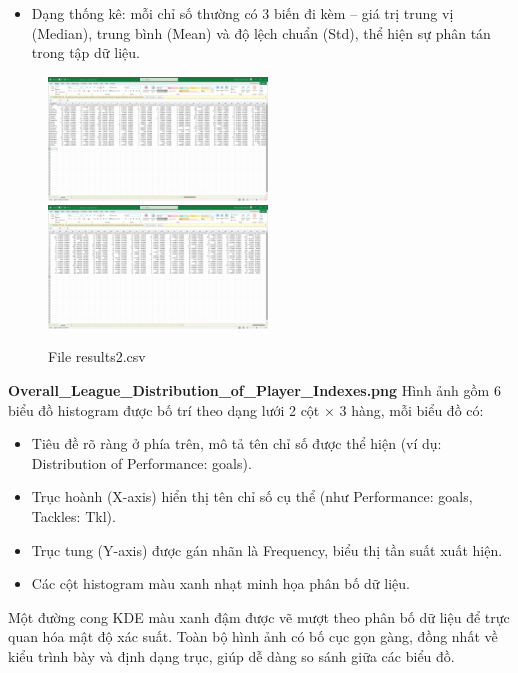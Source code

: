 \documentclass[12pt]{report}
\begin{document}
{\begin{itemize}
	\item Dạng thống kê: mỗi chỉ số thường có 3 biến đi kèm – giá trị trung vị (Median), trung bình (Mean) và độ lệch chuẩn (Std), thể hiện sự phân tán trong tập dữ liệu.
\end{itemize}
\begin{figure}[h]
    \centering
    \includegraphics[width=220px]{results2.png}
    \includegraphics[width=220px]{results2_1.png}
    \caption{File results2.csv}
    \label{fig:res2}
\end{figure}
\textbf{Overall\_League\_Distribution\_of\_Player\_Indexes.png}
Hình ảnh gồm 6 biểu đồ histogram được bố trí theo dạng lưới 2 cột × 3 hàng, mỗi biểu đồ có:
\begin{itemize}
	\item Tiêu đề rõ ràng ở phía trên, mô tả tên chỉ số được thể hiện (ví dụ: Distribution of Performance: goals).
	\item Trục hoành (X-axis) hiển thị tên chỉ số cụ thể (như Performance: goals, Tackles: Tkl).
	\item Trục tung (Y-axis) được gán nhãn là Frequency, biểu thị tần suất xuất hiện.
	\item Các cột histogram màu xanh nhạt minh họa phân bố dữ liệu.
\end{itemize}
Một đường cong KDE màu xanh đậm được vẽ mượt theo phân bố dữ liệu để trực quan hóa mật độ xác suất.
Toàn bộ hình ảnh có bố cục gọn gàng, đồng nhất về kiểu trình bày và định dạng trục, giúp dễ dàng so sánh giữa các biểu đồ.
\begin{figure}[h]
    \centering

\end{figure}}
\end{document}
